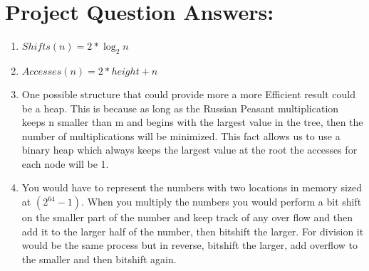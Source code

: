\documentclass[10pt]{article}
\begin{document}
\pagestyle{project}

\section*{Project Question Answers:}
\begin{enumerate}
	\item $Shifts(n) = 2*\log_2{n}$
	\item $Accesses(n) = 2*height + n$
	\item One possible structure that could provide more a more Efficient result
	could be a heap. This is because as long as the Russian Peasant
	multiplication keeps n smaller than m and begins with the largest value in
	the tree, then the number of multiplications will be minimized. This fact 
	allows us to use a binary heap which always keeps the largest value at the
	root the accesses for each node will be 1.
	\item You would have to represent the numbers with two locations in memory
	sized at $(2^{64}-1)$. When you multiply the numbers you would perform a bit
	shift on the smaller part of the number and keep track of any over flow and
	then add it to the larger half of the number, then bitshift the larger.
	For division it would be the same process but in reverse, bitshift the
	larger, add overflow to the smaller and then bitshift again.
\end{enumerate}
\end{document}
